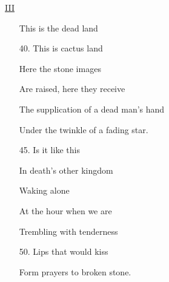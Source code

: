 \documentclass[10pt]{article}
\begin{document}
\begin{multicols}{2}

    \begin{minipage}[t][0.45\textheight]{0.4\textwidth}
        \begin{center} \underline{III} \end{center}
        \begin{enumerate}
            \item[] This is the dead land
            \item[40.] This is cactus land
            \item[] Here the stone images
            \item[] Are raised, here they receive
            \item[] The supplication of a dead man's hand
            \item[] Under the twinkle of a fading star.
            \item[]
            \item[45.] Is it like this 
            \item[] In death's other kingdom
            \item[] Waking alone
            \item[] At the hour when we are
            \item[] Trembling with tenderness
            \item[50.] Lips that would kiss
            \item[] Form prayers to broken stone.
        \end{enumerate}
    \end{minipage}


\end{multicols}
\end{document}
